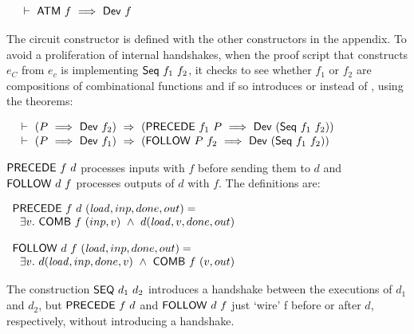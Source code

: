 \documentclass{llncs}
\begin{document}
\vspace*{-4mm}
$$\begin{array}{l}
~\vdash\ \mathsf{ATM}\ f\ \Longrightarrow \  \mathsf{Dev}\ f\\
\phantom{~~~~~~~~~~~~~~~~~~~~~~~~~~~~~~~~~~~~~~~~~~~~~~~~~~~~~~~~~~~~~~~~~~~~~~~~~~~~~~~~~~~~~~~~~~~~~~~~~~~~~}\\[-4mm]
\end{array}$$

\noindent The circuit constructor  is defined with the other constructors in the appendix.
To avoid a proliferation  of internal handshakes, when the proof script that constructs $e_C$ from $e_c$ 
is implementing $\mathsf{Seq}~f_1~f_2$, it checks to see whether $f_1$ or $f_2$ 
are compositions of combinational functions and if so introduces  or  instead of ,
using the theorems:

\vspace*{-4mm}
$$\begin{array}{l}
~\vdash\
      (P\ \Longrightarrow\ \mathsf{Dev}~f_2)~\Rightarrow~(\mathsf{PRECEDE}~f_1~P\ \Longrightarrow\ \mathsf{Dev}\ (\mathsf{Seq}~f_1~f_2))\\
\phantom{~~~~~~~~~~~~~~~~~~~~~~~~~~~~~~~~~~~~~~~~~~~~~~~~~~~~~~~~~~~~~~~~~~~~~~~~~~~~~~~~~~~~~~~~~~~~~~~~~~~~~~}\\[-4mm]
~\vdash\
(P\ \Longrightarrow\ \mathsf{Dev}~f_1)~\Rightarrow~(\mathsf{FOLLOW}~P~f_2\  \Longrightarrow\ \mathsf{Dev}\ (\mathsf{Seq}~f_1~f_2))\\
\end{array}$$


\noindent $\mathsf{PRECEDE}~f~d$ processes inputs with $f$ before sending them to $d$ and
$\mathsf{FOLLOW}~d~f$ processes outputs of $d$ with
$f$. The definitions are:

\vspace*{3mm}

$\begin{array}{l}
\mathsf{PRECEDE}~f~d~(\mathit{load},inp,done,out)  =\\
~~ \exists v.~ \mathsf{COMB}~f~(inp,v) ~\wedge~ d(\mathit{load},v,done,out)\\
 \\
\mathsf{FOLLOW}~d~f~ (\mathit{load},inp,done,out)  =\\
~~ \exists v.~d(\mathit{load},inp,done,v) ~\wedge~ \mathsf{COMB}~f~(v,out)
\end{array}$
\vspace*{3mm}

The construction $\mathsf{SEQ}~d_1~d_2$ introduces a handshake between the executions
of $d_1$ and $d_2$, but $\mathsf{PRECEDE}~f~d$ and $\mathsf{FOLLOW}~d~f$
just `wire' f before or after $d$, respectively, without introducing a
handshake. 
\end{document}
